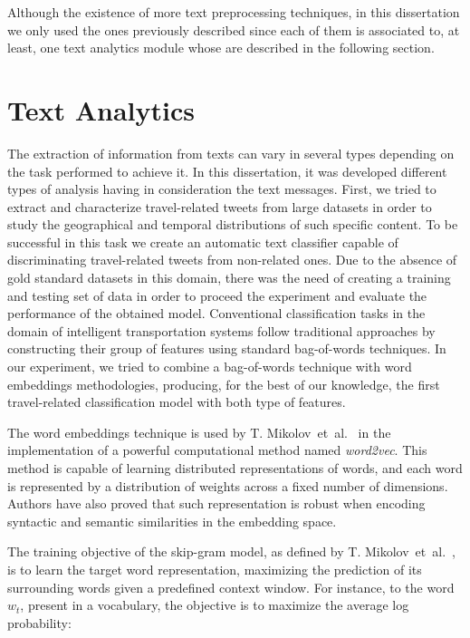 Although the existence of more text preprocessing techniques, in this dissertation we only used the ones previously described since each of them is associated to, at least, one text analytics module whose are described in the following section.

\section{Text Analytics}\label{sec:text_analytics}

The extraction of information from texts can vary in several types depending on the task performed to achieve it. In this dissertation, it was developed different types of analysis having in consideration the text messages. First, we tried to extract and characterize travel-related tweets from large datasets in order to study the geographical and temporal distributions of such specific content. To be successful in this task we create an automatic text classifier capable of discriminating travel-related tweets from non-related ones. Due to the absence of gold standard datasets in this domain, there was the need of creating a training and testing set of data in order to proceed the experiment and evaluate the performance of the obtained model. Conventional classification tasks in the domain of intelligent transportation systems follow traditional approaches by constructing their group of features using standard bag-of-words techniques. In our experiment, we tried to combine a bag-of-words technique with word embeddings methodologies, producing, for the best of our knowledge, the first travel-related classification model with both type of features.

The word embeddings technique is used by T. Mikolov~et~al.~\cite{mikolov2013efficient} in the implementation of a powerful computational method named \emph{word2vec}. This method is capable of learning distributed representations of words, and each word is represented by a distribution of weights across a fixed number of dimensions. Authors have also proved that such representation is robust when encoding syntactic and semantic similarities in the embedding space.

The training objective of the skip-gram model, as defined by T. Mikolov~et~al.~\cite{mikolov2013linguistic}, is to learn the target word representation, maximizing the prediction of its surrounding words given a predefined context window. For instance, to the word $w_t$, present in a vocabulary, the objective is to maximize the average log probability:

